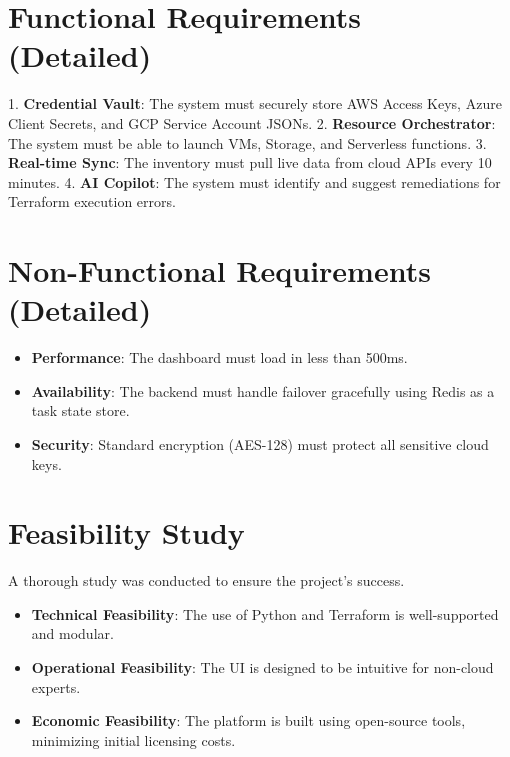 \section{Functional Requirements (Detailed)}
1. \textbf{Credential Vault}: The system must securely store AWS Access Keys, Azure Client Secrets, and GCP Service Account JSONs.
2. \textbf{Resource Orchestrator}: The system must be able to launch VMs, Storage, and Serverless functions.
3. \textbf{Real-time Sync}: The inventory must pull live data from cloud APIs every 10 minutes.
4. \textbf{AI Copilot}: The system must identify and suggest remediations for Terraform execution errors.

\section{Non-Functional Requirements (Detailed)}
\begin{itemize}
    \item \textbf{Performance}: The dashboard must load in less than 500ms.
    \item \textbf{Availability}: The backend must handle failover gracefully using Redis as a task state store.
    \item \textbf{Security}: Standard encryption (AES-128) must protect all sensitive cloud keys.
\end{itemize}

\section{Feasibility Study}
A thorough study was conducted to ensure the project’s success.
\begin{itemize}
    \item \textbf{Technical Feasibility}: The use of Python and Terraform is well-supported and modular.
    \item \textbf{Operational Feasibility}: The UI is designed to be intuitive for non-cloud experts.
    \item \textbf{Economic Feasibility}: The platform is built using open-source tools, minimizing initial licensing costs.
\end{itemize}

\newpage
